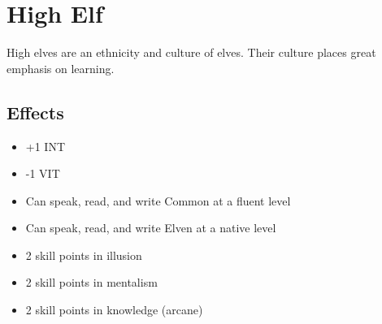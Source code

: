 \section{High Elf}\label{culture:high-elf}
High elves are an ethnicity and culture of elves. Their culture places great
emphasis on learning.

\subsection{Effects}
\begin{itemize}
    \item +1 INT
    \item -1 VIT
    \item Can speak, read, and write Common at a fluent level
    \item Can speak, read, and write Elven at a native level
    \item 2 skill points in illusion
    \item 2 skill points in mentalism
    \item 2 skill points in knowledge (arcane)
\end{itemize}
